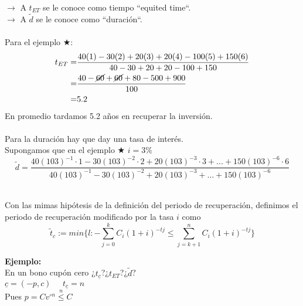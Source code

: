 $\rightarrow$ A $t_{ET}$ se le conoce como tiempo ``equited time``.\\
$\rightarrow$ A $\tilde{d}$ se le conoce como ``duración``.\\ \\
Para el ejemplo $\bigstar$: 
\begin{align*}
  t_{ET} =& \frac{40(1)-30(2)+20(3)+20(4)-100(5) + 150(6)}{40-30+20+20-100+150}\\
=& \frac{40-\cancel{60}+\cancel{60}+80-500+900}{100}\\
=& 5.2
\end{align*}
En promedio tardamos 5.2 años en recuperar la inversión.\\ \\ 
Para la duración hay que day una tasa de interés. \\
Supongamos que en el ejemplo $\bigstar$ $i=3\%$
$$\tilde{d} = \frac{40(103)^{-1}\cdot 1-30(103)^{-2}\cdot2+20(103)^{-3}\cdot 3+...+150(103)^{-6}\cdot 6}{40(103)^{-1}-30(103)^{-2}+20(103)^{-3}+...+150(103)^{-6}}$$\\
\begin{definition}
Con las mimas hipótesis de la definición del periodo de recuperación, definimos el periodo de recuperación modificado por la tasa $i$ como
$$\tilde{t}_c := min \{ l : -\sum_{j=0}^k C_i(1+i)^{-tj} \leq \sum_{j=k+1}^n C_i(1+i)^{-tj}\}$$
\end{definition}
\textbf{Ejemplo:}\\
En un bono cupón cero ¿$t_{\underline{c}}$?¿$t_{ET}$?¿$\tilde{d}$?\\
$\underline{c} = (-p,c) \phantom{abc} t_{\underline{c}} = n$\\
Pues $p=Cv^{\circ n}\overset{n}{\leq} C$
\begin{center}
    



\end{center}

